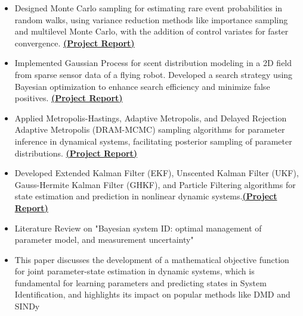 \documentclass[10pt,a4paper,ragged2e,withhyper]{altacv}
\begin{document}
\begin{itemize}
    \item Designed Monte Carlo sampling for estimating rare event probabilities in random walks, using variance reduction methods like importance sampling and multilevel Monte Carlo, with the addition of control variates for faster convergence. \href{https://drive.google.com/file/d/1Zj1cKTC8zAlYv7HGjWjmpgrZB7GvdGne/view?usp=sharing}{\textbf{(Project Report)}}
    
    \item Implemented Gaussian Process for scent distribution modeling in a 2D ﬁeld from sparse sensor data of a ﬂying robot. Developed a search strategy using Bayesian optimization to enhance search eﬃciency and minimize false positives. \href{https://drive.google.com/file/d/1rmVl7ab2_pvmfXvd2gHSURzPaVzqsEAP/view?usp=sharing}{\textbf{(Project Report)}}
    
    \item Applied Metropolis-Hastings, Adaptive Metropolis, and Delayed Rejection Adaptive Metropolis (DRAM-MCMC) sampling algorithms for parameter inference in dynamical systems, facilitating posterior sampling of parameter distributions. \href{https://drive.google.com/file/d/1U3EeO3B7XSDwNVYHuw6a2UAFkQemIKku/view?usp=sharing}{\textbf{(Project Report)}}
    
    \item Developed Extended Kalman Filter (EKF), Unscented Kalman Filter (UKF), Gauss-Hermite Kalman Filter (GHKF), and Particle Filtering algorithms for state estimation and prediction in nonlinear dynamic systems.\href{https://drive.google.com/file/d/1JPkWKbcHBsgtdJ1h-xOj_W0QmosTLNj2/view?usp=sharing}{\textbf{(Project Report)}}
\end{itemize}

\divider

\begin{itemize}
    \item Literature Review on "Bayesian system ID: optimal management of parameter model, and measurement uncertainty"
    \item This paper discusses the development of a mathematical objective function for joint parameter-state estimation in dynamic systems, which is fundamental for learning parameters and predicting states in System Identification, and highlights its impact on popular methods like DMD and SINDy

\end{itemize}
\end{document}
